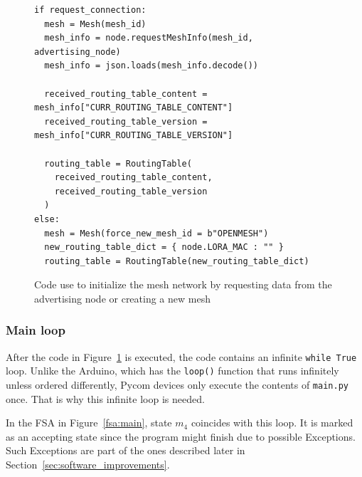 				\begin{figure}	
					\begin{lstlisting}
if request_connection:
  mesh = Mesh(mesh_id)
  mesh_info = node.requestMeshInfo(mesh_id, advertising_node)
  mesh_info = json.loads(mesh_info.decode())

  received_routing_table_content = mesh_info["CURR_ROUTING_TABLE_CONTENT"]
  received_routing_table_version = mesh_info["CURR_ROUTING_TABLE_VERSION"]
  
  routing_table = RoutingTable(
    received_routing_table_content, 
    received_routing_table_version
  )
else:
  mesh = Mesh(force_new_mesh_id = b"OPENMESH")
  new_routing_table_dict = { node.LORA_MAC : "" }
  routing_table = RoutingTable(new_routing_table_dict)
					\end{lstlisting}
					\label{code:mesh_init_2}
					\caption{Code use to initialize the mesh network by requesting data from the advertising node or creating a new mesh}
				\end{figure}
			
	
			\subsubsection{Main loop}\label{subsec:loop}
	
				After the code in Figure~\ref{code:mesh_init_2} is executed, the code contains an infinite \texttt{while True} loop.
				Unlike the Arduino, which has the \texttt{loop()} function that runs infinitely unless ordered differently, Pycom devices only execute the contents of \texttt{main.py} once. 
				That is why this infinite loop is needed.
				
				In the FSA in Figure~\ref{fsa:main}, state $ m_{4} $ coincides with this loop.
				It is marked as an accepting state since the program might finish due to possible Exceptions.
				Such Exceptions are part of the ones described later in Section~\ref{sec:software_improvements}.
				
